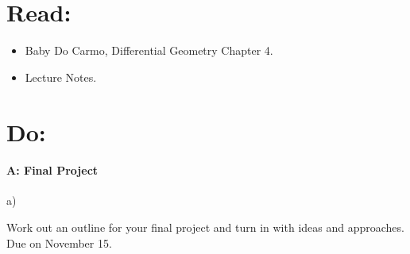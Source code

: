 \documentclass[12pt]{article}
\title{\rightline {\Huge {Due: November, 15}}}
\author{\LARGE {HMC\quad Math 142 \quad Fall 2017} 
\\ {Prof. Gu}  
\\ {\LARGE Problem Set 9}}
\date{Start this assignment before Sunday night!}
\begin{document}
\maketitle

\section*{ Read: } 

\begin{itemize}
\item{Baby Do Carmo, Differential Geometry
    Chapter 4.}
\item{Lecture Notes.}
\end{itemize}

\section*{ Do: }

\medskip
\paragraph{A: Final Project}

\begin{itemize}
{\item a)} Work out an outline for your final project and turn in with ideas and approaches. Due on November 15.
\end{itemize}
\end{document}
